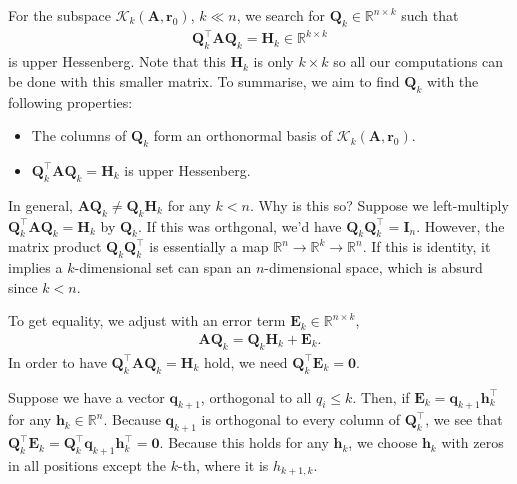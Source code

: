 \documentclass[12pt,a4paper]{article} %
\begin{document}
For the subspace $\mathcal K_k (\mathbf A, \bm r_0)$, $k \ll n$, 
we search for $\mathbf Q_k \in \mathbb R^{n \times k}$ such that 
\begin{align*}
    \mathbf Q_k^\top \mathbf A \mathbf Q_k = \mathbf H_k \in \mathbb R^{k \times k}
\end{align*}
is upper Hessenberg. Note that this $\mathbf H_k$ is only $k \times k$ so 
all our computations can be done with this smaller matrix. To summarise, 
we aim to find $\mathbf Q_k$ with the following properties:
\begin{itemize}
    \item The columns  of $\mathbf Q_k$ form an orthonormal basis of $\mathcal K_k (\mathbf A, \bm r_0)$.
    \item $\mathbf Q_k^\top \mathbf A \mathbf Q_k = \mathbf H_k$ is upper Hessenberg.
\end{itemize}
In general, $\mathbf A \mathbf Q_k \ne \mathbf Q_k \mathbf H_k$ for any $k < n$.
Why is this so? Suppose we left-multiply $\mathbf Q_k^\top \mathbf A \mathbf Q_k = \mathbf H_k$
 by $\mathbf Q_k$. 
If this was orthgonal, we'd have $\mathbf Q_k \mathbf Q_k^\top = \mathbf I_n$.
However, the matrix product  $\mathbf Q_k \mathbf Q_k^\top$ is essentially 
a map $\mathbb R^n \to \mathbb R^k \to \mathbb R^n$. If this is identity, 
it implies a $k$-dimensional set can span an $n$-dimensional space, 
which is absurd since $k < n$.

To get equality, we adjust with an error term $\mathbf E_k \in \mathbb R^{n \times k}$,
\begin{align*}
    \mathbf A \mathbf Q_k = \mathbf Q_k \mathbf H_k + \mathbf E_k.
\end{align*}
In order to have $\mathbf Q_k^\top \mathbf A \mathbf Q_k = \mathbf H_k$ 
hold, we need $\mathbf Q_k^\top \mathbf E_k = \mathbf 0$.

Suppose we have a vector $\bm q_{k+1}$, orthogonal to all $q_i \le k$.
Then, if $\mathbf E_k = \bm q_{k+1} \bm h^\top_{k}$ for any $\bm h_k \in \mathbb R^n$. 
Because $\bm q_{k+1}$ is orthogonal to every column of $\mathbf Q_k^\top$, we 
see that $\mathbf Q_k^\top \mathbf E_k = \mathbf Q_k^\top \bm q_{k+1} \bm h^\top_{k} = \mathbf 0$. 
Because this holds for any $\bm h_k$, we choose $\bm h_k$ with zeros in all positions 
except the $k$-th, where it is $h_{k+1,k}$.
\end{document}

